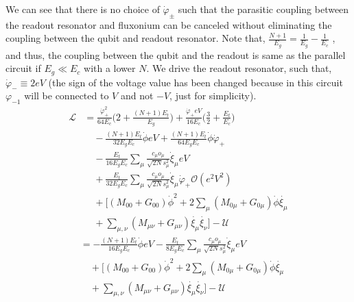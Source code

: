 \documentclass[%
reprint,
superscriptaddress,
 amsmath,amssymb,
 aps,
 prx,
longbibliography,
floatfix,
]{revtex4-2}
\newcommand{\sh}[1]{{\color{blue}{{}[SS: #1]}}}%
\begin{document}
We can see that there is no choice of $\dot{\varphi}_{\pm}$ such that the parasitic coupling between the readout resonator and fluxonium can be canceled without eliminating the coupling between the qubit and readout resonator. Note that, $\frac{N+1}{E_g}=\frac{1}{E_g}-\frac{1}{E_c}$ \sh{weird!}, and thus, the coupling between the qubit and the readout is same as the parallel circuit if $E_g \ll E_c$ with a lower $N$. We drive the readout resonator, such that, $\dot{\varphi}_{-}\equiv 2eV$ (the sign of the voltage value has been changed because in this circuit $\varphi_{-1}$ will be connected to $V$ and not $-V$, just for simplicity).
\begin{align}
    \mathcal{L}&=\frac{\dot{\varphi}_{+}^2}{64E_c}\Big(2+\frac{(N+1)E_t}{E_g}\Big)+\frac{\dot{\varphi}_{+}eV}{16E_c}\Big(\frac{3}{2}+\frac{E_t}{E_c}\Big)\nonumber\\
    &\quad-\frac{(N+1)E_t}{32E_gE_c}\dot{\phi}eV+\frac{(N+1)E_t}{64E_gE_c}\dot{\phi}\dot{\varphi}_{+}\nonumber\\
    &\quad -\frac{E_t}{16E_gE_c} \sum_\mu\frac{c_\mu o_\mu}{\sqrt{2N}s_\mu^2}  \dot{\xi}_\mu eV\nonumber\\
    &\quad+\frac{E_t}{32E_gE_c} \sum_\mu\frac{c_\mu o_\mu}{\sqrt{2N}s_\mu^2}  \dot{\xi}_\mu\dot{\varphi}_{+}\mathcal{O}(e^2V^2)\nonumber\\
    &\quad+\Big[(M_{00}+G_{00})\dot{\phi}^2+2\sum_{\mu}(M_{0\mu}+G_{0\mu})\dot{\phi}\dot{\xi_\mu}\nonumber\\
    &\quad+\sum_{\mu,\nu}(M_{\mu\nu}+G_{\mu\nu})\dot{\xi_\mu}\dot{\xi_\nu}\Big]-\mathcal{U}
\end{align}
\sh{Correct the derivation in numerics and text to only use grounded resonator and then extend briefly to the floating case. We are ding so by eliminating all terms with $E_c^3, E_c^4$ and using $\dot \varphi_{-2}=0, \dot\varphi_{-1}=-2eV$. Thus, $\varphi_{+}=\varphi_{-}=-2eV$. So this point everything will be correct and we do not need to change the equations for Ec but only for Eg
} 
\begin{align}
    &=-\frac{(N+1)E_t}{16E_gE_c}\dot{\phi}eV-\frac{E_t}{8E_gE_c} \sum_\mu\frac{c_\mu o_\mu}{\sqrt{2N}s_\mu^2}  \dot{\xi}_\mu eV\nonumber\\
    &\quad+\Big[(M_{00}+G_{00})\dot{\phi}^2+2\sum_{\mu}(M_{0\mu}+G_{0\mu})\dot{\phi}\dot{\xi_\mu}\nonumber\\&\quad+\sum_{\mu,\nu}(M_{\mu\nu}+G_{\mu\nu})\dot{\xi_\mu}\dot{\xi_\nu}\Big]-\mathcal{U}
\end{align}
\end{document}
